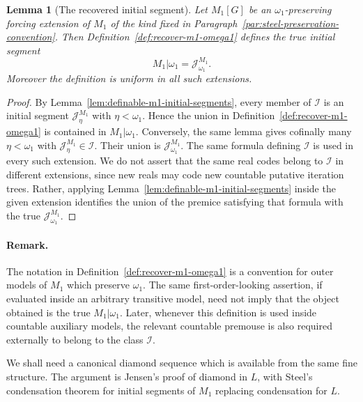 \documentclass[a4paper,11pt]{article}
\newtheorem{lemma}[theorem]{Lemma}
\begin{document}
\begin{lemma}[The recovered initial segment]\label{lem:recover-m1-omega1}
Let $M_1[G]$ be an $\omega_1$-preserving forcing extension of $M_1$ of the kind fixed in Paragraph~\ref{par:steel-preservation-convention}.  Then Definition~\ref{def:recover-m1-omega1} defines the true initial segment
\[
   M_1|\omega_1=\mathcal J^{M_1}_{\omega_1}.
\]
Moreover the definition is uniform in all such extensions.
\end{lemma}

\begin{proof}
By Lemma~\ref{lem:definable-m1-initial-segments}, every member of $\mathcal I$ is an initial segment $\mathcal J^{M_1}_\eta$ with $\eta<\omega_1$.  Hence the union in Definition~\ref{def:recover-m1-omega1} is contained in $M_1|\omega_1$.  Conversely, the same lemma gives cofinally many $\eta<\omega_1$ with $\mathcal J_\eta^{M_1}\in\mathcal I$.  Their union is $\mathcal J^{M_1}_{\omega_1}$.  The same formula defining $\mathcal I$ is used in every such extension.  We do not assert that the same real codes belong to $\mathcal I$ in different extensions, since new reals may code new countable putative iteration trees.  Rather, applying Lemma~\ref{lem:definable-m1-initial-segments} inside the given extension identifies the union of the premice satisfying that formula with the true $\mathcal J^{M_1}_{\omega_1}$.
\end{proof}

\paragraph{Remark.}\label{rem:m1-omega1-not-absolute}
The notation in Definition~\ref{def:recover-m1-omega1} is a convention for outer models of $M_1$ which preserve $\omega_1$.  The same first-order-looking assertion, if evaluated inside an arbitrary transitive model, need not imply that the object obtained is the true $M_1|\omega_1$.  Later, whenever this definition is used inside countable auxiliary models, the relevant countable premouse is also required externally to belong to the class $\mathcal I$.


We shall need a canonical diamond sequence which is available from the same fine structure.  The argument is Jensen's proof of diamond in $L$, with Steel's condensation theorem for initial segments of $M_1$ replacing condensation for $L$.
\end{document}
